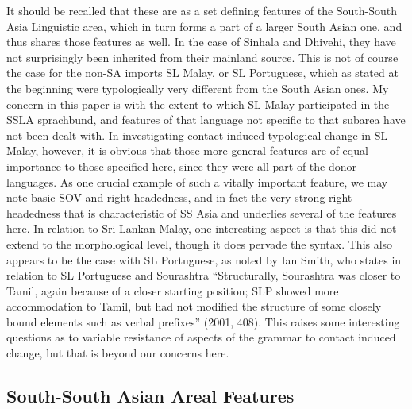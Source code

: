\documentclass[letterpaper]{article}
\begin{document}
It should be recalled that these are as a set defining  features of the South-South Asia Linguistic area, which in turn forms a part of a larger South Asian one, and thus shares those features as well. In the case of Sinhala and Dhivehi, they have not surprisingly been inherited from their mainland source. This is not of course the case for the non-SA imports SL Malay, or SL Portuguese, which  as stated at the beginning were typologically very different from the South Asian ones. My concern in this paper is with the extent to which SL Malay participated in the SSLA sprachbund, and features of that language not specific to that subarea have not been dealt with. In investigating contact induced typological change in SL Malay, however, it is obvious that those more general features are of equal importance to those specified here, since they were all part of the donor languages. As one crucial example of such a vitally important feature, we may note basic SOV and right-headedness, and in fact the very strong right-headedness that is characteristic of SS Asia and underlies several of the features here. In relation to Sri Lankan Malay, one interesting aspect is that this did not extend to the morphological level, though it does pervade the syntax. This also appears to be the case with SL Portuguese, as noted by Ian Smith, who states in relation to SL Portuguese and Sourashtra ``Structurally, Sourashtra was closer to Tamil, again because of a closer starting position; SLP showed more accommodation to Tamil, but had not modified the structure of some closely bound elements such as verbal prefixes'' (2001, 408). This raises some interesting questions as to variable resistance of aspects of the grammar to contact induced change, but that is beyond our concerns here.

\subsection{South-South Asian Areal Features}
\end{document}
